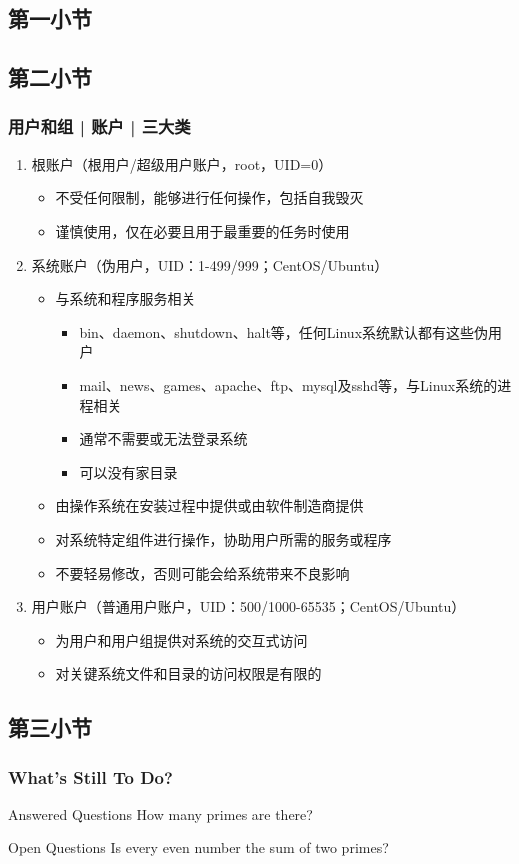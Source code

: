 \documentclass[UTF8,table]{ctexbeamer}
\begin{document}
\subsection{第一小节}
\subsection{第二小节}
\begin{frame}
	\frametitle{用户和组 | 账户 | \alert{三大类}}
	\begin{enumerate}
		\item<1-> 根账户（根用户/超级用户账户，root，UID=0）
		\begin{itemize}
			\item<4-> 不受任何限制，能够进行任何操作，包括自我毁灭
			\item<5-> 谨慎使用，仅在必要且用于最重要的任务时使用
		\end{itemize}
		\item<2-> 系统账户（伪用户，UID：1-499/999；CentOS/Ubuntu）
		\begin{itemize}
			\item<6-> 与系统和程序服务相关
			\begin{itemize}
				\item bin、daemon、shutdown、halt等，任何Linux系统默认都有这些伪用户
				\item mail、news、games、apache、ftp、mysql及sshd等，与Linux系统的进程相关
				\item 通常不需要或无法登录系统
				\item 可以没有家目录
			\end{itemize}
			\item<6-> 由操作系统在安装过程中提供或由软件制造商提供
			\item<6-> 对系统特定组件进行操作，协助用户所需的服务或程序
			\item<7-> 不要轻易修改，否则可能会给系统带来不良影响
		\end{itemize}
		\item<3-> 用户账户（普通用户账户，UID：500/1000-65535；CentOS/Ubuntu）
		\begin{itemize}
			\item<8-> 为用户和用户组提供对系统的交互式访问
			\item<8-> 对关键系统文件和目录的访问权限是有限的
		\end{itemize}
	\end{enumerate}
\end{frame}

\subsection{第三小节}
\begin{frame}
	\frametitle{What's Still To Do?}
	\begin{block}{Answered Questions}
		How many primes are there?
	\end{block}
	\begin{block}{Open Questions}
		Is every even number the sum of two primes?
	\end{block}
\end{frame}
\end{document}
